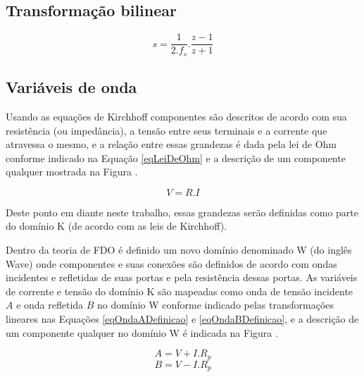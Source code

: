 	\subsection{Transformação bilinear}
	
	\begin{equation}
		\label{eqTransformacaoBilinear}
		s = \frac{1}{2.f_s}.\frac{z-1}{z+1}
	\end{equation}
	
	\subsection{Variáveis de onda}
	
	Usando as equações de Kirchhoff componentes são descritos de acordo com sua resistência (ou impedância), a tensão entre seus terminais e a corrente que atravessa o mesmo, e a relação entre essas grandezas é dada pela lei de Ohm conforme indicado na Equação \ref{eqLeiDeOhm} e a descrição de um componente qualquer mostrada na Figura .
	
	\begin{equation}
	\label{eqLeiDeOhm}
		V = R . I
	\end{equation} 
	
	Deste ponto em diante neste trabalho, essas grandezas serão definidas como parte do domínio K (de acordo com as leis de Kirchhoff). 
	
	\cite{Fettweis1986}	Dentro da teoria de FDO é definido um novo domínio denominado W (do inglês Wave) onde componentes e suas conexões são definidos de acordo com ondas incidentes e refletidas de suas portas e pela resistência dessas portas. As variáveis de corrente e tensão do domínio K são mapeadas como onda de tensão incidente $A$ e onda refletida $B$ no domínio W conforme indicado pelas transformações lineares nas Equações \ref{eqOndaADefinicao} e \ref{eqOndaBDefinicao}, e a descrição de um componente qualquer no domínio W é indicada na Figura .
	
	\begin{equation}
	\label{eqOndaADefinicao}
		A = V + I . R_p
	\end{equation}
	\begin{equation}
	\label{eqOndaBDefinicao}
		B = V - I . R_p
	\end{equation}
	
